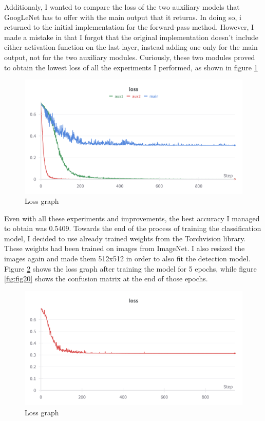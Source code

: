 Additionaly, I wanted to compare the loss of the two auxiliary models that GoogLeNet has to offer with the main output that it returns. In doing so, i returned to the initial implementation for the forward-pass method. However, I made a mistake in that I forgot that the original implementation doesn't include either activation function on the last layer, instead adding one only for the main output, not for the two auxiliary modules. Curiously, these two modules proved to obtain the lowest loss of all the experiments I performed, as shown in figure \ref{fig:fig18}\\
\begin{figure}[ht!]
    \centering
    \includegraphics[width=1\linewidth]{figures/Figure19.png}
    \caption{Loss graph}
    \label{fig:fig18}
\end{figure}
Even with all these experiments and improvements, the best accuracy I managed to obtain was 0.5409. Towards the end of the process of training the classification model, I decided to use already trained weights from the Torchvision library. These weights had been trained on images from ImageNet. I also resized the images again and made them 512x512 in order to also fit the detection model. Figure \ref{fig:fig19} shows the loss graph after training the model for 5 epochs, while figure \ref{fig:fig20} shows the confusion matrix at the end of those epochs.\\
\begin{figure}[ht!]
    \centering
    \includegraphics[width=1\linewidth]{figures/Figure20.png}
    \caption{Loss graph}
    \label{fig:fig19}
\end{figure}

